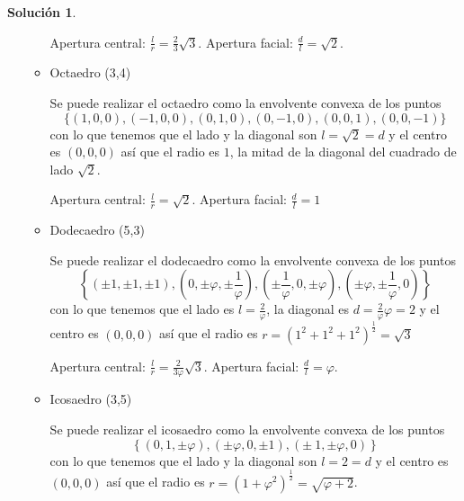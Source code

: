 \documentclass[10pt]{article}
\theoremstyle{definition}
\newtheorem*{sol}{Solución}
\begin{document}
\begin{sol}
\begin{enumerate}[(a)]
\begin{itemize}
    Apertura central: $\frac{l}{r}=\frac{2}{3}\sqrt{3}.$
    Apertura facial: $\frac{d}{l}=\sqrt{2}$.
    \item Octaedro (3,4)
    
    Se puede realizar el octaedro como la envolvente convexa de los puntos 
    \[\{(1,0,0),(-1,0,0),(0,1,0),(0,-1,0),(0,0,1),(0,0,-1)\}\]
    con lo que tenemos que el lado y la diagonal son $l=\sqrt{2}=d$ y el centro es $(0,0,0)$ así que el radio es $1$, la mitad de la diagonal del cuadrado de lado $\sqrt{2}$.
    
    Apertura central: $\frac{l}{r}=\sqrt{2}$.
    Apertura facial: $\frac{d}{l}=1$
    
    
    \item Dodecaedro (5,3)
    
    Se puede realizar el dodecaedro como la envolvente convexa de los puntos \[\left\{\left(\pm 1,\pm 1,\pm 1\right),\left(0,\pm\varphi,\pm\frac{1}{\varphi}\right),\left(\pm\frac{1}{\varphi}, 0,\pm\varphi\right),\left(\pm \varphi,\pm\frac{1}{\varphi},0\right)\right\}\]
    con lo que tenemos que el lado es $l=\frac{2}{\varphi}$, la diagonal es $d=\frac{2}{\varphi}\varphi=2$ y el centro es $(0,0,0)$ así que el radio es $r=\left(1^2+1^2+1^2\right)^{\frac{1}{2}}=\sqrt{3}$
    
    Apertura central: $\frac{l}{r}=\frac{2}{3\varphi}\sqrt{3}$.
    Apertura facial: $\frac{d}{l}=\varphi$.
    
    \item Icosaedro (3,5)
    
    Se puede realizar el icosaedro como la envolvente convexa de los puntos \[\left\{\left(0,1,\pm\varphi\right),\left(\pm\varphi,0,\pm 1\right),\left(\pm\ 1,\pm\varphi,0\right)\right\}\]
    con lo que tenemos que el lado y la diagonal son $l=2=d$ y el centro es $(0,0,0)$ así que el radio es $r=\left(1+\varphi^2\right)^\frac{1}{2}=\sqrt{\varphi+2}$.
    

\end{itemize}
\end{enumerate}
\end{sol}
\end{document}
